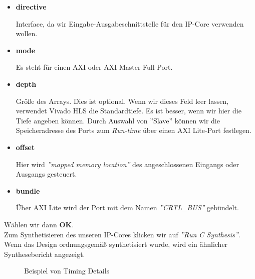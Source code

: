 \documentclass[a4paper]{report}
\begin{document}
	\begin{itemize}
		\item  \textbf{directive}
		
		Interface, da wir Eingabe-Ausgabeschnittstelle für den IP-Core verwenden wollen.
		
		\item  \textbf{mode}
		
		Es steht für einen AXI oder AXI Master Full-Port.

		\item  \textbf{depth}

		Größe des Arrays. Dies ist optional. Wenn wir dieses Feld leer lassen, verwendet Vivado HLS die Standardtiefe. Es ist besser, wenn wir hier die Tiefe angeben können. Durch Auswahl von ''Slave'' können wir die Speicheradresse des Ports zum \textit{Run-time} über einen AXI Lite-Port festlegen.
		
		\item  \textbf{offset}
		
		Hier wird \textit{''mapped memory location''} des angeschlossenen Eingangs oder Ausgangs gesteuert.
				
		\item  \textbf{bundle}
		
		Über AXI Lite wird der Port mit dem Namen \textit{''CRTL\_BUS''} gebündelt.
		
	\end{itemize}


Wählen wir dann \textbf{OK}.\\

Zum Synthetisieren des unseren IP-Cores klicken wir auf \textit{''Run C Synthesis''}.\\

Wenn das Design ordnungsgemäß synthetisiert wurde, wird ein ähnlicher Synthesebericht angezeigt.\\

\begin{figure}[H]
\centering
{}
\caption{Beispiel von Timing Details}
\label{fig:Beispiel_von_Timing_Details}
\end{figure}
\end{document}
